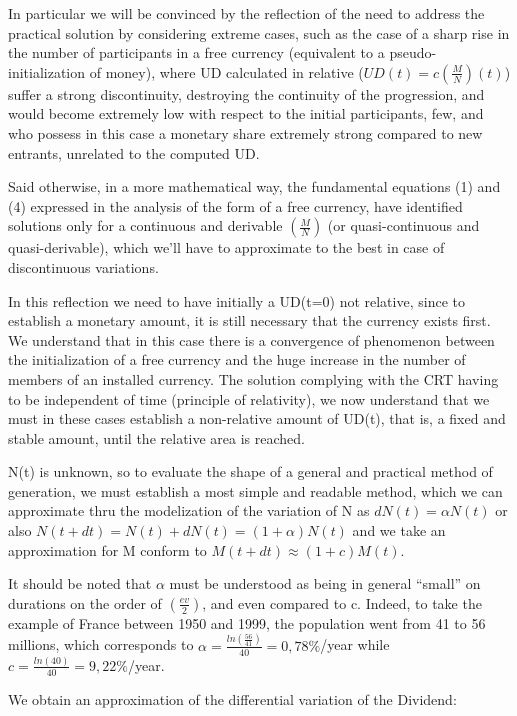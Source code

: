 \documentclass[a4paper,oneside,12pt]{article}
\begin{document}
In particular we will be convinced by the reflection of the need to
address the practical solution by considering extreme cases, such as
the case of a sharp rise in the number of participants in a free
currency (equivalent to a pseudo-initialization of money), where UD
calculated in relative ($UD(t)=c\left(\frac{M}{N}\right)(t)$) suffer a
strong discontinuity, destroying the continuity of the progression,
and would become extremely low with respect to the initial
participants, few, and who possess in this case a monetary share
extremely strong compared to new entrants, unrelated to the computed
UD.

Said otherwise, in a more mathematical way, the fundamental equations
(1) and (4) expressed in the analysis of the form of a free currency,
have identified solutions only for a continuous and derivable 
$\left(\frac{M}{N}\right)$ (or quasi-continuous and quasi-derivable),
which we'll have to approximate to the best in case of discontinuous
variations.

In this reflection we need to have initially a UD(t=0) not relative,
since to establish a monetary amount, it is still necessary that the
currency exists first.  We understand that in this case there is a
convergence of phenomenon between the initialization of a free
currency and the huge increase in the number of members of an
installed currency.  The solution complying with the CRT having to be
independent of time (principle of relativity), we now understand that
we must in these cases establish a non-relative amount of UD(t),
that is, a fixed and stable amount, until the relative area is reached.

N(t) is unknown, so to evaluate the shape of a general and practical
method of generation, we must establish a most simple and readable
method, which we can approximate thru the modelization of the
variation of N as $dN(t)=\alpha N(t)$ or also
$N(t+dt)=N(t)+dN(t)=(1+\alpha)N(t)$ and we take an approximation for M
conform to $M(t+dt) \approx (1+c) M(t)$.
\par

It should be noted that $\alpha$  must be understood as being in
general ``small'' on durations on the order of
 $\left( \frac{ev}{2} \right)$, and even compared to c.  Indeed, to
take the example of France between 1950 and 1999, the population went
from 41 to 56 millions, which corresponds to
$ \alpha = \frac{ln(\frac{56}{41})}{40} = 0,78 \%$/year while
$c=\frac{ln(40)}{40}=9,22 \%$/year.

We obtain an approximation of the differential variation of the Dividend:
\end{document}

